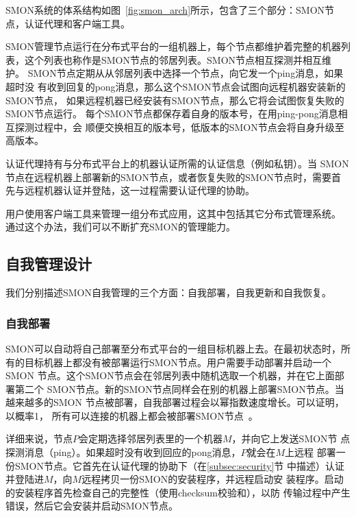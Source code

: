 SMON系统的体系结构如图~\ref{fig:smon_arch}所示，包含了三个部分：SMON节
点，认证代理和客户端工具。

SMON管理节点运行在分布式平台的一组机器上，每个节点都维护着完整的机器列
表，这个列表也称作是SMON节点的邻居列表。SMON节点相互探测并相互维护。
SMON节点定期从从邻居列表中选择一个节点，向它发一个ping消息，如果超时没
有收到回复的pong消息，那么这个SMON节点会试图向远程机器安装新的SMON节点，
如果远程机器已经安装有SMON节点，那么它将会试图恢复失败的SMON节点运行。
每个SMON节点都保存着自身的版本号，在用ping-pong消息相互探测过程中，会
顺便交换相互的版本号，低版本的SMON节点会将自身升级至高版本。

认证代理持有与分布式平台上的机器认证所需的认证信息（例如私钥）。当
SMON节点在远程机器上部署新的SMON节点，或者恢复失败的SMON节点时，需要首
先与远程机器认证并登陆，这一过程需要认证代理的协助。

用户使用客户端工具来管理一组分布式应用，这其中包括其它分布式管理系统。
通过这个办法，我们可以不断扩充SMON的管理能力。

\subsection{自我管理设计}

我们分别描述SMON自我管理的三个方面：自我部署，自我更新和自我恢复。

\subsubsection*{自我部署}


SMON可以自动将自己部署至分布式平台的一组目标机器上去。在最初状态时，所
有的目标机器上都没有被部署运行SMON节点。用户需要手动部署并启动一个SMON
节点。这个SMON节点会在邻居列表中随机选取一个机器，并在它上面部署第二个
SMON节点。新的SMON节点同样会在别的机器上部署SMON节点。当越来越多的SMON
节点被部署，自我部署过程会以幂指数速度增长。可以证明，以概率1，
所有可以连接的机器上都会被部署SMON节点~\cite{Eugster2004}。

详细来说，节点$P$会定期选择邻居列表里的一个机器$M$，并向它上发送SMON节
点探测消息（ping）。如果超时没有收到回应的pong消息，$P$就会在$M$上远程
部署一份SMON节点。它首先在认证代理的协助下（在\ref{subsec:security}节
中描述）认证并登陆进$M$，向$M$远程拷贝一份SMON的安装程序，并远程启动安
装程序。启动的安装程序首先检查自己的完整性（使用checksum校验和），以防
传输过程中产生错误，然后它会安装并启动SMON节点。

